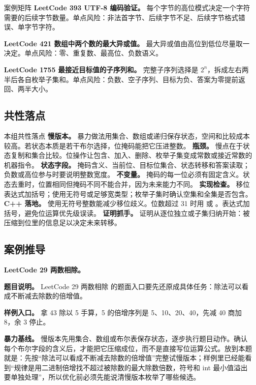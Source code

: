 \begin{principlebox}{案例矩阵}
\textbf{LeetCode 393 UTF-8 编码验证。}
每个字节的高位模式决定一个字符需要的后续字节数量。单点风险：非法首字节、后续字节不足、后续字节格式错误、单字节字符。

\textbf{LeetCode 421 数组中两个数的最大异或值。}
最大异或值由高位到低位尽量取一决定。单点风险：零、重复数、最高位、负数语义。

\textbf{LeetCode 1755 最接近目标值的子序列和。}
完整子序列选择是 \ensuremath{2^{n}}，拆成左右两半后各自枚举子集和。单点风险：负数、空子序列、目标为负、答案为零提前返回、两半大小。

\end{principlebox}

\subsection{共性落点}

\begin{principlebox}{本组共性落点}
\textbf{慢版本。} 暴力做法用集合、数组或递归保存状态，空间和比较成本较高。若状态本质是若干布尔选择，位掩码能把它压进整数。
\textbf{瓶颈。} 慢点在于状态复制和集合比较。位操作让包含、加入、删除、枚举子集变成常数或接近常数的机器指令。
\textbf{状态字段。} 掩码含义、当前位、目标位集合、状态转移和答案读取；负数或高位参与时要说明整数宽度。
\textbf{不变量。} 掩码的每一位必须有固定含义。状态去重时，位置相同但掩码不同不能合并，因为未来能力不同。
\textbf{实现检查。} 移位表达式加括号；使用无符号或足够宽类型；枚举子集时确认空集和全集是否包含。
\textbf{C++ 落地。} 使用无符号整数能减少移位歧义。位数超过 31 时用  或 。表达式加括号，避免位运算优先级误读。
\textbf{证明抓手。} 证明从逐位独立或子集归纳开始：被压缩到位里的信息足以决定未来转移。
\end{principlebox}

\subsection{案例推导}

\noindent\textbf{LeetCode 29 两数相除。}

\textbf{题目说明。} LeetCode 29 两数相除 的题面入口要先还原成具体任务：除法可以看成不断减去除数的倍增值。

\textbf{样例入口。} 拿 43 除以 5 手算，5 的倍增序列是 5、10、20、40，先减 40 商加 8，余 3 停止。

\textbf{暴力基线。} 慢版本先用集合、数组或布尔表保存状态，逐步执行题目动作。确认每个布尔字段的含义后，才能把它压缩成位，而不是直接写位运算公式。放到本题就是：先按“除法可以看成不断减去除数的倍增值”完整试慢版本；样例里已经能看到“规律是用二进制倍增找不超过被除数的最大除数倍数，符号和 int 最小值溢出要单独处理”，所以优化前必须先能说清慢版本枚举了哪些候选。

